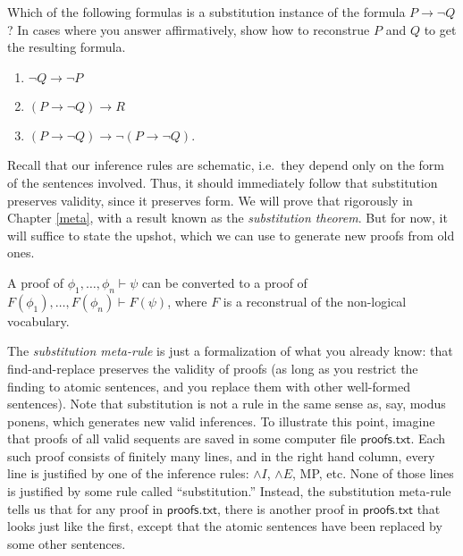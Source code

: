 
\begin{exercise} Which of the following formulas is a substitution instance of
  the formula $P\to \neg Q$?  In cases where you answer affirmatively,
  show how to reconstrue $P$ and $Q$ to get the resulting formula.
\begin{enumerate}
\item $\neg Q\to \neg P$
\item $(P\to \neg Q)\to R$
\item $(P\to \neg Q)\to \neg (P\to \neg Q)$.
\end{enumerate}  
\end{exercise}

Recall that our inference rules are schematic, i.e.\ they depend only
on the form of the sentences involved.  Thus, it should immediately
follow that substitution preserves validity, since it preserves form.
We will prove that rigorously in Chapter \ref{meta}, with a result
known as the \emph{substitution theorem}.  But for now, it will
suffice to state the upshot, which we can use to generate new proofs
from old ones.

\bigskip 
\begin{tcolorbox}[enhanced,width=10cm,title=substitution,attach boxed title to top
  left={yshift=-2mm,xshift=4mm},boxed title style={sharp corners}]
  A proof of $\phi _1,\dots ,\phi _n\vdash\psi$ can be converted to a
  proof of $F(\phi _1),\dots ,F(\phi _n)\vdash F(\psi )$, where $F$ is
  a reconstrual of the non-logical vocabulary.
\end{tcolorbox}
\bigskip

The \emph{substitution meta-rule} is just a formalization of what you
already know: that find-and-replace preserves the validity of proofs
(as long as you restrict the finding to atomic sentences, and you
replace them with other well-formed sentences).  Note that
substitution is not a rule in the same sense as, say, modus ponens,
which generates new valid inferences.  To illustrate this point,
imagine that proofs of all valid sequents are saved in some computer
file $\mathsf{proofs.txt}$.  Each such proof consists of finitely many
lines, and in the right hand column, every line is justified by one of
the inference rules: $\wedge I$, $\wedge E$, MP, etc.  None of those
lines is justified by some rule called ``substitution.''  Instead, the
substitution meta-rule tells us that for any proof in
$\mathsf{proofs.txt}$, there is another proof in $\mathsf{proofs.txt}$
that looks just like the first, except that the atomic sentences have
been replaced by some other sentences.

